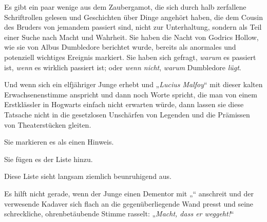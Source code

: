 Es gibt ein paar wenige aus dem Zaubergamot, die sich durch halb zerfallene Schriftrollen gelesen und Geschichten über Dinge angehört haben, die dem Cousin des Bruders von jemandem passiert sind, nicht zur Unterhaltung, sondern als Teil einer Suche nach Macht und Wahrheit. Sie haben die Nacht von Godrics Hollow, wie sie von Albus Dumbledore berichtet wurde, bereits als anormales und potenziell wichtiges Ereignis markiert. Sie haben sich gefragt, \emph{warum} es passiert ist, \emph{wenn} es wirklich passiert ist; oder \emph{wenn nicht}, \emph{warum} Dumbledore \emph{lügt}.

Und wenn sich ein elfjähriger Junge erhebt und
„\emph{Lucius Malfoy}“ mit dieser kalten Erwachsenenstimme anspricht und dann noch Worte spricht, die man von einem Erstklässler in Hogwarts einfach nicht erwarten würde, dann lassen sie diese Tatsache nicht in die gesetzlosen Unschärfen von Legenden und die Prämissen von Theaterstücken gleiten.

Sie markieren es als einen Hinweis.

Sie fügen es der Liste hinzu.

Diese Liste sieht langsam ziemlich beunruhigend aus.

Es hilft nicht gerade, wenn der Junge einen Dementor mit „“ anschreit und der verwesende Kadaver sich flach an die gegenüberliegende Wand presst und seine schreckliche, ohrenbetäubende Stimme rasselt:
„\emph{Macht, dass er weggeht!}“

